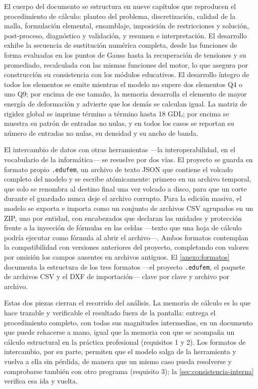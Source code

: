 El cuerpo del documento se estructura en nueve capítulos que reproducen el procedimiento de cálculo: planteo del problema, discretización, calidad de la malla, formulación elemental, ensamblaje, imposición de restricciones y solución, post-proceso, diagnóstico y validación, y resumen e interpretación. El desarrollo exhibe la secuencia de sustitución numérica completa, desde las funciones de forma evaluadas en los puntos de Gauss hasta la recuperación de tensiones y su promediado, recalculada con las mismas funciones del motor, lo que asegura por construcción su consistencia con los módulos educativos. El desarrollo íntegro de todos los elementos se emite mientras el modelo no supere dos elementos Q4 o uno Q9; por encima de ese tamaño, la memoria desarrolla el elemento de mayor energía de deformación y advierte que los demás se calculan igual. La matriz de rigidez global se imprime término a término hasta 18 GDL; por encima se muestra su patrón de entradas no nulas, y en todos los casos se reportan su número de entradas no nulas, su densidad y su ancho de banda.

El intercambio de datos con otras herramientas —la interoperabilidad, en el vocabulario de la informática— se resuelve por dos vías. El proyecto se guarda en formato propio \texttt{.edufem}, un archivo de texto JSON que contiene el volcado completo del modelo y se escribe atómicamente: primero en un archivo temporal, que solo se renombra al destino final una vez volcado a disco, para que un corte durante el guardado nunca deje el archivo corrupto. Para la edición masiva, el modelo se exporta e importa como un conjunto de archivos CSV agrupados en un ZIP, uno por entidad, con encabezados que declaran las unidades y protección frente a la inyección de fórmulas en las celdas ---texto que una hoja de cálculo podría ejecutar como fórmula al abrir el archivo---. Ambos formatos contemplan la compatibilidad con versiones anteriores del proyecto, completando con valores por omisión los campos ausentes en archivos antiguos. El \autoref{anexo:formatos} documenta la estructura de los tres formatos —el proyecto \texttt{.edufem}, el paquete de archivos CSV y el DXF de importación— clave por clave y archivo por archivo.

Estas dos piezas cierran el recorrido del análisis. La memoria de cálculo es lo que hace trazable y verificable el resultado fuera de la pantalla: entrega el procedimiento completo, con todas sus magnitudes intermedias, en un documento que puede rehacerse a mano, igual que la memoria con que se acompaña un cálculo estructural en la práctica profesional (requisitos 1 y 2). Los formatos de intercambio, por su parte, permiten que el modelo salga de la herramienta y vuelva a ella sin pérdida, de manera que un mismo caso pueda resolverse y comprobarse también con otro programa (requisito 3); la \autoref{sec:consistencia-interna} verifica esa ida y vuelta.
